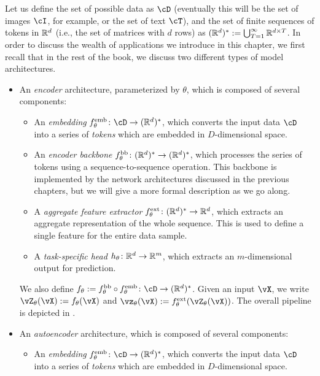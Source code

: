 \documentclass[../../book-main.tex]{subfiles}
\begin{document}
Let us define the set of possible data as \(\cD\) (eventually this will be the set of images \(\cI\), for example, or the set of text \(\cT\)), and the set of finite sequences of tokens in \(\mathbb{R}^{d}\) (i.e., the set of matrices with \(d\) rows) as \((\mathbb{R}^{d})^{*} := \bigcup_{T = 1}^{\infty}\mathbb{R}^{d \times T}\). In order to discuss the wealth of applications we introduce in this chapter, we first recall that in the rest of the book, we discuss two different types of model architectures.
\begin{itemize}
    \item An \textit{encoder} architecture, parameterized by \(\theta\), which is composed of several components:
    \begin{itemize}
        \item An \textit{embedding} \(f_{\theta}^{\emb} \colon \cD \to (\R^{d})^{*}\), which converts the input data \(\cD\) into a series of \textit{tokens} which are embedded in \(D\)-dimensional space.
        \item An \textit{encoder backbone} \(f_{\theta}^{\mathrm{bb}} \colon (\mathbb{R}^{d})^{*} \to (\mathbb{R}^{d})^{*}\), which processes the series of tokens using a sequence-to-sequence operation. This backbone is implemented by the network architectures discussed in the previous chapters, but we will give a more formal description as we go along.
        \item A \textit{aggregate feature extractor} \(f_{\theta}^{\mathrm{ext}} \colon (\mathbb{R}^{d})^{*} \to \mathbb{R}^{d}\), which extracts an aggregate representation of the whole sequence. This is used to define a single feature for the entire data sample.
        \item A \textit{task-specific head} \(h_{\theta} \colon \mathbb{R}^{d} \to \mathbb{R}^{m}\), which extracts an \(m\)-dimensional output for prediction.
    \end{itemize}
    We also define \(f_{\theta} := f_{\theta}^{\backbone} \circ f_{\theta}^{\emb} \colon \cD \to (\R^{d})^{*}\). Given an input \(\vX\), we write \(\vZ_{\theta}(\vX) := f_{\theta}(\vX)\) and \(\vz_{\theta}(\vX) := f_{\theta}^{\ext}(\vZ_{\theta}(\vX))\). The overall pipeline is depicted in .
    \item An \textit{autoencoder} architecture, which is composed of several components:
    \begin{itemize}
        \item An \textit{embedding} \(f_{\theta}^{\emb} \colon \cD \to (\R^{d})^{*}\), which converts the input data \(\cD\) into a series of \textit{tokens} which are embedded in \(D\)-dimensional space.

\end{itemize}
\end{itemize}
\end{document}
